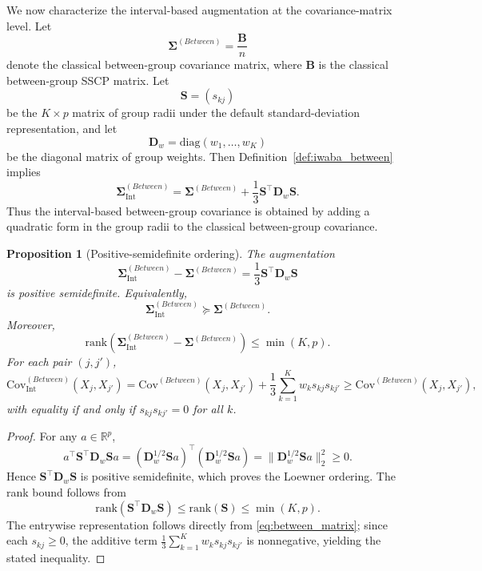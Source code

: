 \documentclass[preprint, times, 12pt, authoryear]{elsarticle}
\newtheorem{proposition}[theorem]{Proposition}
\begin{document}
 We now characterize the interval-based augmentation at the covariance-matrix level. Let
 \[
 \boldsymbol{\Sigma}^{(Between)}=\frac{\mathbf B}{n}
 \]
 denote the classical between-group covariance matrix, where $\mathbf B$ is the classical between-group SSCP matrix. Let
 \[
 \mathbf S=(s_{kj})
 \]
 be the $K\times p$ matrix of group radii under the default standard-deviation representation, and let
 \[
 \mathbf D_w=\mathrm{diag}(w_1,\ldots,w_K)
 \]
 be the diagonal matrix of group weights. Then Definition~\ref{def:iwaba_between} implies
 \begin{equation}\label{eq:between_matrix}
 	\boldsymbol{\Sigma}_{\mathrm{Int}}^{(Between)}
 	=
 	\boldsymbol{\Sigma}^{(Between)}
 	+
 	\frac{1}{3}\mathbf S^\top \mathbf D_w \mathbf S.
 \end{equation}
 Thus the interval-based between-group covariance is obtained by adding a quadratic form in the group radii to the classical between-group covariance.
 
 \begin{proposition}[Positive-semidefinite ordering]\label{prop:dominance}
 	The augmentation
 	\[
 	\boldsymbol{\Sigma}_{\mathrm{Int}}^{(Between)}-\boldsymbol{\Sigma}^{(Between)}
 	=
 	\frac{1}{3}\mathbf S^\top \mathbf D_w \mathbf S
 	\]
 	is positive semidefinite. Equivalently,
 	\[
 	\boldsymbol{\Sigma}_{\mathrm{Int}}^{(Between)} \succeq \boldsymbol{\Sigma}^{(Between)}.
 	\]
 	Moreover,
 	\[
 	\mathrm{rank}\!\left(\boldsymbol{\Sigma}_{\mathrm{Int}}^{(Between)}-\boldsymbol{\Sigma}^{(Between)}\right)
 	\le \min(K,p).
 	\]
 	For each pair $(j,j')$,
 	\[
 	\mathrm{Cov}_{\mathrm{Int}}^{(Between)}(X_j,X_{j'})
 	=
 	\mathrm{Cov}^{(Between)}(X_j,X_{j'})
 	+
 	\frac{1}{3}\sum_{k=1}^K w_k s_{kj}s_{kj'}
 	\ge
 	\mathrm{Cov}^{(Between)}(X_j,X_{j'}),
 	\]
 	with equality if and only if $s_{kj}s_{kj'}=0$ for all $k$.
 \end{proposition}
 
 \begin{proof}
 	For any $a\in\mathbb R^p$,
 	\[
 	a^\top \mathbf S^\top \mathbf D_w \mathbf S a
 	=
 	(\mathbf D_w^{1/2}\mathbf S a)^\top(\mathbf D_w^{1/2}\mathbf S a)
 	=
 	\|\mathbf D_w^{1/2}\mathbf S a\|_2^2
 	\ge 0.
 	\]
 	Hence $\mathbf S^\top \mathbf D_w \mathbf S$ is positive semidefinite, which proves the Loewner ordering. The rank bound follows from
 	\[
 	\mathrm{rank}(\mathbf S^\top \mathbf D_w \mathbf S)\le \mathrm{rank}(\mathbf S)\le \min(K,p).
 	\]
 	The entrywise representation follows directly from \eqref{eq:between_matrix}; since each $s_{kj}\ge 0$, the additive term $\frac13\sum_{k=1}^K w_k s_{kj}s_{kj'}$ is nonnegative, yielding the stated inequality.
 \end{proof}
 
\end{document}
